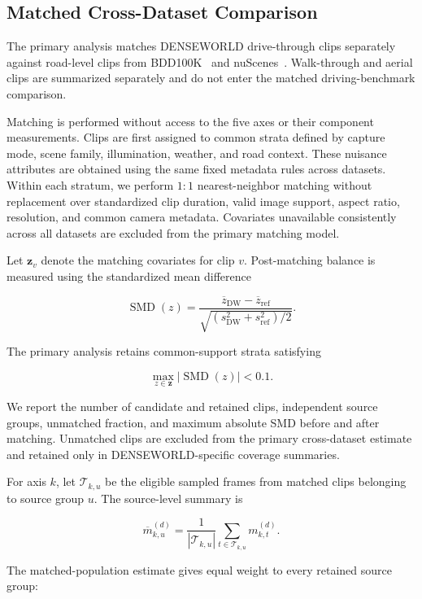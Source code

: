 \subsection{Matched Cross-Dataset Comparison}
\label{app:matched_comparison}

The primary analysis matches DENSEWORLD drive-through clips separately
against road-level clips from BDD100K~\cite{yu2020bdd100k} and
nuScenes~\cite{caesar2020nuscenes}. Walk-through and aerial clips are
summarized separately and do not enter the matched driving-benchmark
comparison.

Matching is performed without access to the five axes or their
component measurements. Clips are first assigned to common strata
defined by capture mode, scene family, illumination, weather, and road
context. These nuisance attributes are obtained using the same fixed
metadata rules across datasets. Within each stratum, we perform
\(1{:}1\) nearest-neighbor matching without replacement over
standardized clip duration, valid image support, aspect ratio,
resolution, and common camera metadata. Covariates unavailable
consistently across all datasets are excluded from the primary matching
model.

Let \(\mathbf z_v\) denote the matching covariates for clip \(v\).
Post-matching balance is measured using the standardized mean
difference

\[
\operatorname{SMD}(z)
=
\frac{
\overline z_{\mathrm{DW}}
-
\overline z_{\mathrm{ref}}
}{
\sqrt{
(s_{\mathrm{DW}}^2+s_{\mathrm{ref}}^2)/2
}
}.
\]

The primary analysis retains common-support strata satisfying

\[
\max_{z\in\mathbf z}
|\operatorname{SMD}(z)|<0.1.
\]

We report the number of candidate and retained clips, independent source
groups, unmatched fraction, and maximum absolute SMD before and after
matching. Unmatched clips are excluded from the primary cross-dataset
estimate and retained only in DENSEWORLD-specific coverage summaries.

For axis \(k\), let \(\mathcal T_{k,u}\) be the eligible sampled frames
from matched clips belonging to source group \(u\). The source-level
summary is

\[
\overline m_{k,u}^{(d)}
=
\frac{1}{|\mathcal T_{k,u}|}
\sum_{t\in\mathcal T_{k,u}}
m_{k,t}^{(d)}.
\]

The matched-population estimate gives equal weight to every retained
source group:

